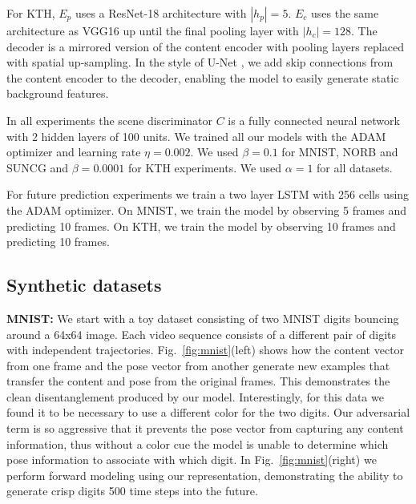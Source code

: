 \documentclass{article}
\newcommand{\fig}[1]{Fig.~\ref{fig:#1}}
\begin{document}
For KTH, $E_p$ uses a ResNet-18 architecture with
$\left\vert{h_p}\right\vert = 5$.  $E_c$ uses the same
architecture as VGG16 \cite{vgg} up until the final pooling layer with
$\left\vert{h_c}\right\vert = 128$. The decoder is a mirrored
version of the content encoder with pooling layers replaced with
spatial up-sampling. In the style of U-Net \cite{ronneberger2015u}, we add skip connections from the content encoder
to the decoder, enabling the model to easily generate static
background features.  

In all experiments the scene discriminator $C$ is a fully connected
neural network with 2 hidden layers of 100 units.  We trained all our
models with the ADAM optimizer \cite{Kingma2015} and learning rate
$\eta=0.002$. We used $\beta = 0.1$ for MNIST, NORB and SUNCG and $\beta = 0.0001$ for KTH experiments.
We used $\alpha = 1$ for all datasets.

For future prediction experiments we train a two layer LSTM with 256
cells using the ADAM optimizer.  On MNIST, we train the model by
observing 5 frames and predicting 10 frames.  On KTH, we train the
model by observing 10 frames and predicting 10 frames.

\subsection{Synthetic datasets}\label{sec:toy}{\bf MNIST:} We start with a toy dataset consisting of two MNIST
digits bouncing around a 64x64 image. Each video sequence consists of
a different pair of digits with independent
trajectories. \fig{mnist}(left) shows how the content vector from one
frame and the pose vector from another generate new examples that
transfer the content and pose from the original frames. This
demonstrates the clean disentanglement produced by our
model. Interestingly, for this data we found it to be necessary to
use a different color for the two digits. Our adversarial term is so
aggressive that it prevents the pose vector from capturing any content
information, thus without a color cue the model is unable to determine
which pose information to associate with which digit. 
In \fig{mnist}(right) we perform forward modeling using our
representation, demonstrating the ability to generate crisp digits 500
time steps into the future.    
\end{document}
